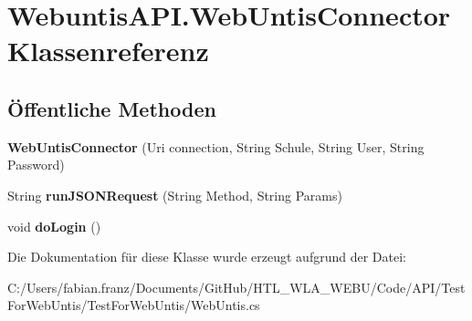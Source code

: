 \hypertarget{class_webuntis_a_p_i_1_1_web_untis_connector}{\section{Webuntis\-A\-P\-I.\-Web\-Untis\-Connector Klassenreferenz}
\label{class_webuntis_a_p_i_1_1_web_untis_connector}
}
\subsection*{Öffentliche Methoden}
\begin{DoxyCompactItemize}
\item 
\hypertarget{class_webuntis_a_p_i_1_1_web_untis_connector_a869ba1eee9abfcaccd47568968907c6a}{{\bfseries Web\-Untis\-Connector} (Uri connection, String Schule, String User, String Password)}\label{class_webuntis_a_p_i_1_1_web_untis_connector_a869ba1eee9abfcaccd47568968907c6a}

\item 
\hypertarget{class_webuntis_a_p_i_1_1_web_untis_connector_ab201f5e754219e27cc4a9f4605c3a7a5}{String {\bfseries run\-J\-S\-O\-N\-Request} (String Method, String Params)}\label{class_webuntis_a_p_i_1_1_web_untis_connector_ab201f5e754219e27cc4a9f4605c3a7a5}

\item 
\hypertarget{class_webuntis_a_p_i_1_1_web_untis_connector_a167133c8790268a2822e5221268359fe}{void {\bfseries do\-Login} ()}\label{class_webuntis_a_p_i_1_1_web_untis_connector_a167133c8790268a2822e5221268359fe}

\end{DoxyCompactItemize}


Die Dokumentation für diese Klasse wurde erzeugt aufgrund der Datei\-:\begin{DoxyCompactItemize}
\item 
C\-:/\-Users/fabian.\-franz/\-Documents/\-Git\-Hub/\-H\-T\-L\-\_\-\-W\-L\-A\-\_\-\-W\-E\-B\-U/\-Code/\-A\-P\-I/\-Test\-For\-Web\-Untis/\-Test\-For\-Web\-Untis/Web\-Untis.\-cs\end{DoxyCompactItemize}
